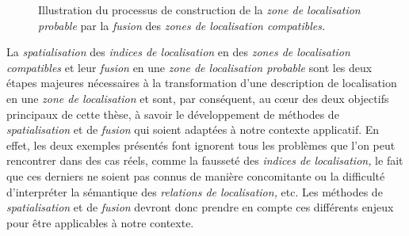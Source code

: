 \begin{figure}
  \centering
  
  \caption{Illustration du processus de construction de la \emph{zone
      de localisation probable} par la \emph{fusion} des \emph{zones
      de localisation compatibles.}}
  \label{fig:obj_fus}
\end{figure}

La \emph{spatialisation} des \emph{indices de localisation} en des
\emph{zones de localisation compatibles} et leur \emph{fusion} en une
\emph{zone de localisation probable} sont les deux étapes majeures
nécessaires à la transformation d'une description de localisation en
une \emph{zone de localisation} et sont, par conséquent, au cœur des
deux objectifs principaux de cette thèse, à savoir le développement de
méthodes de \emph{spatialisation} et de \emph{fusion} qui soient
adaptées à notre contexte applicatif. En effet, les deux exemples
présentés font ignorent tous les problèmes que l'on peut rencontrer
dans des cas réels, comme la fausseté des \emph{indices de
  localisation,} le fait que ces derniers ne soient pas connus de
manière concomitante ou la difficulté d'interpréter la sémantique des
\emph{relations de localisation,} etc. Les méthodes de
\emph{spatialisation} et de \emph{fusion} devront donc prendre en
compte ces différents enjeux pour être applicables à notre contexte.


